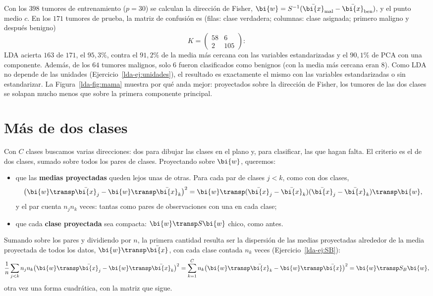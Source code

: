 \begin{example}\label{lda-ejem:mama}
Con los $398$ tumores de entrenamiento ($p=30$) se calculan la dirección de
Fisher, $\bi{w}=S^{-1}(\bar{\bi{x}}_{\text{mal}}-\bar{\bi{x}}_{\text{ben}})$, y el punto medio
$c$. En los $171$ tumores de prueba, la matriz de confusión es (filas: clase
verdadera; columnas: clase asignada; primero maligno y después benigno)
\[
K=\begin{pmatrix}58&6\\2&105\end{pmatrix}:
\]
LDA acierta $163$ de $171$, el $95{,}3\%$, contra el $91{,}2\%$ de la media
más cercana con las variables estandarizadas y el $90{,}1\%$ de PCA con una
componente. Además, de los $64$ tumores malignos, solo $6$ fueron
clasificados como benignos (con la media más cercana eran $8$). Como LDA no
depende de las unidades (Ejercicio~\ref{lda-ej:unidades}), el resultado es
exactamente el mismo con las variables estandarizadas o sin estandarizar. La Figura~\ref{lda-fig:mama}
muestra por qué anda mejor: proyectados sobre la dirección de Fisher, los
tumores de las dos clases se solapan mucho menos que sobre la primera
componente principal.
\end{example}


\section{Más de dos clases}\label{lda-sec:multi}

Con $C$ clases buscamos varias direcciones: dos para dibujar las clases en el
plano y, para clasificar, las que hagan falta. El criterio es el de dos
clases, sumado sobre todos los pares de clases. Proyectando sobre $\bi{w}$,
queremos:
\begin{itemize}[leftmargin=*,itemsep=1pt]
\item que las \textbf{medias proyectadas} queden lejos unas de otras. Para
cada par de clases $j<k$, como con dos clases,
\[
\bigl(\bi{w}\transp\bar{\bi{x}}_j-\bi{w}\transp\bar{\bi{x}}_k\bigr)^2=\bi{w}\transp(\bar{\bi{x}}_j-\bar{\bi{x}}_k)(\bar{\bi{x}}_j-\bar{\bi{x}}_k)\transp \bi{w} ,
\]
y el par cuenta $n_jn_k$ veces: tantas como pares de observaciones con una en
cada clase;
\item que cada \textbf{clase proyectada} sea compacta: $\bi{w}\transp S\bi{w}$ chico, como
antes.
\end{itemize}
Sumando sobre los pares y dividiendo por $n$, la primera cantidad resulta ser
la dispersión de las medias proyectadas alrededor de la media proyectada de
todos los datos, $\bi{w}\transp\bar{\bi{x}}$, con cada clase contada $n_k$ veces
(Ejercicio~\ref{lda-ej:SB}):
\[
\frac1n\sum_{j<k}n_jn_k\bigl(\bi{w}\transp\bar{\bi{x}}_j-\bi{w}\transp\bar{\bi{x}}_k\bigr)^2
=\sum_{k=1}^Cn_k\bigl(\bi{w}\transp\bar{\bi{x}}_k-\bi{w}\transp\bar{\bi{x}}\bigr)^2=\bi{w}\transp S_B\bi{w} ,
\]
otra vez una forma cuadrática, con la matriz que sigue.

